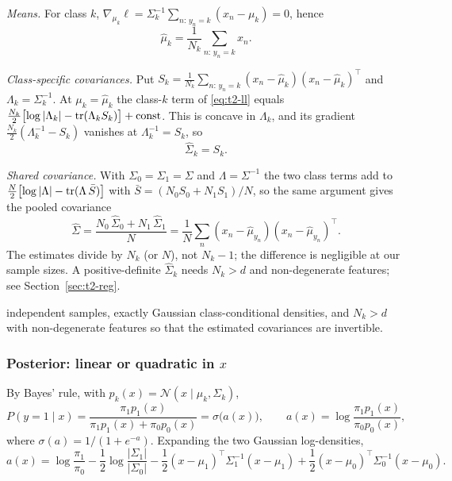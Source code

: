 \emph{Means.} For class $k$, $\nabla_{\mu_k}\ell=\Sigma_k^{-1}\sum_{n:\,y_n=k}(x_n-\mu_k)=0$, hence
\begin{equation}
  \hat\mu_k=\frac1{N_k}\sum_{n:\,y_n=k}x_n .
\end{equation}

\emph{Class-specific covariances.} Put $S_k=\frac1{N_k}\sum_{n:\,y_n=k}(x_n-\hat\mu_k)(x_n-\hat\mu_k)^{\top}$
and $\Lambda_k=\Sigma_k^{-1}$. At $\mu_k=\hat\mu_k$ the class-$k$ term of \eqref{eq:t2-ll} equals
$\frac{N_k}{2}\bigl[\log|\Lambda_k|-\operatorname{tr}(\Lambda_kS_k)\bigr]+\mathrm{const}$. This is concave in
$\Lambda_k$, and its gradient $\frac{N_k}{2}(\Lambda_k^{-1}-S_k)$ vanishes at $\Lambda_k^{-1}=S_k$, so
\begin{equation}
  \hat\Sigma_k=S_k .
\end{equation}

\emph{Shared covariance.} With $\Sigma_0=\Sigma_1=\Sigma$ and $\Lambda=\Sigma^{-1}$ the two class terms
add to $\frac N2\bigl[\log|\Lambda|-\operatorname{tr}(\Lambda\,\bar S)\bigr]$ with $\bar S=(N_0S_0+N_1S_1)/N$, so the same
argument gives the pooled covariance
\begin{equation}
  \hat\Sigma=\frac{N_0\,\hat\Sigma_0+N_1\,\hat\Sigma_1}{N}
  =\frac1N\sum_{n}(x_n-\hat\mu_{y_n})(x_n-\hat\mu_{y_n})^{\top}.
  \label{eq:t2-pooled}
\end{equation}
The estimates divide by $N_k$ (or $N$), not $N_k-1$; the difference is negligible at our sample sizes.
A positive-definite $\hat\Sigma_k$ needs $N_k>d$ and non-degenerate features; see
Section~\ref{sec:t2-reg}.

\begin{assumptions}
independent samples, exactly Gaussian class-conditional densities, and $N_k>d$ with
non-degenerate features so that the estimated covariances are invertible.
\end{assumptions}

\subsubsection{Posterior: linear or quadratic in $x$}
By Bayes' rule, with $p_k(x)=\mathcal N(x\mid\mu_k,\Sigma_k)$,
\begin{equation}
  P(y=1\mid x)=\frac{\pi_1p_1(x)}{\pi_1p_1(x)+\pi_0p_0(x)}=\sigma\bigl(a(x)\bigr),
  \qquad a(x)=\log\frac{\pi_1p_1(x)}{\pi_0p_0(x)},
  \label{eq:t2-post}
\end{equation}
where $\sigma(a)=1/(1+e^{-a})$. Expanding the two Gaussian log-densities,
\begin{equation}
  a(x)=\log\frac{\pi_1}{\pi_0}-\frac12\log\frac{|\Sigma_1|}{|\Sigma_0|}
      -\frac12(x-\mu_1)^{\top}\Sigma_1^{-1}(x-\mu_1)
      +\frac12(x-\mu_0)^{\top}\Sigma_0^{-1}(x-\mu_0).
  \label{eq:t2-a}
\end{equation}

